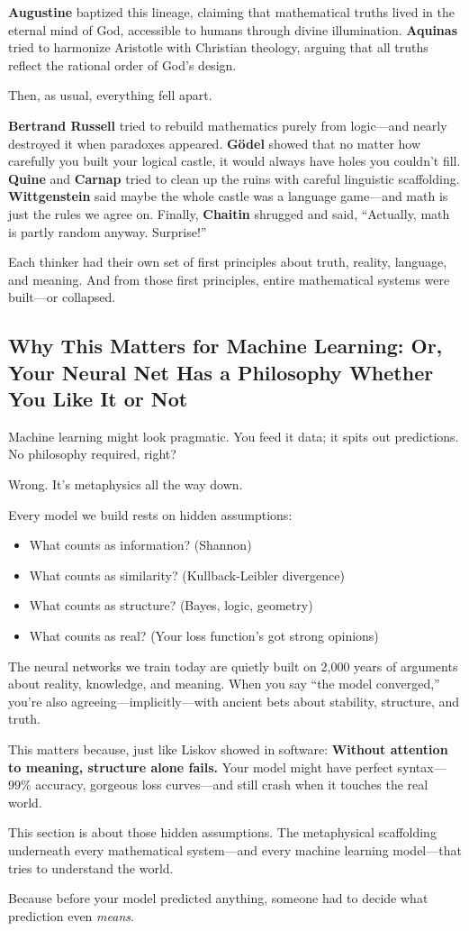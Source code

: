 \textbf{Augustine} baptized this lineage, claiming that mathematical truths lived in the eternal mind of God, accessible to humans through divine illumination.  
\textbf{Aquinas} tried to harmonize Aristotle with Christian theology, arguing that all truths reflect the rational order of God's design.

Then, as usual, everything fell apart.

\textbf{Bertrand Russell} tried to rebuild mathematics purely from logic—and nearly destroyed it when paradoxes appeared.  
\textbf{Gödel} showed that no matter how carefully you built your logical castle, it would always have holes you couldn’t fill.  
\textbf{Quine} and \textbf{Carnap} tried to clean up the ruins with careful linguistic scaffolding.  
\textbf{Wittgenstein} said maybe the whole castle was a language game—and math is just the rules we agree on.  
Finally, \textbf{Chaitin} shrugged and said, “Actually, math is partly random anyway. Surprise!”

Each thinker had their own set of first principles about truth, reality, language, and meaning. And from those first principles, entire mathematical systems were built—or collapsed.

\subsection{Why This Matters for Machine Learning: Or, Your Neural Net Has a Philosophy Whether You Like It or Not}

Machine learning might look pragmatic. You feed it data; it spits out predictions. No philosophy required, right?

Wrong. It’s metaphysics all the way down.

Every model we build rests on hidden assumptions:

\begin{itemize}
    \item What counts as information? (Shannon)
    \item What counts as similarity? (Kullback-Leibler divergence)
    \item What counts as structure? (Bayes, logic, geometry)
    \item What counts as real? (Your loss function’s got strong opinions)
\end{itemize}

The neural networks we train today are quietly built on 2,000 years of arguments about reality, knowledge, and meaning.  
When you say ``the model converged,'' you’re also agreeing—implicitly—with ancient bets about stability, structure, and truth.

This matters because, just like Liskov showed in software:  
\textbf{Without attention to meaning, structure alone fails.}  
Your model might have perfect syntax—99\% accuracy, gorgeous loss curves—and still crash when it touches the real world.

This section is about those hidden assumptions.  
The metaphysical scaffolding underneath every mathematical system—and every machine learning model—that tries to understand the world.

Because before your model predicted anything, someone had to decide what prediction even \emph{means}.
